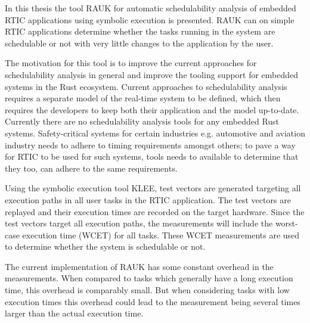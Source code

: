 In this thesis the tool RAUK for automatic schedulability analysis of embedded
RTIC applications using symbolic execution is presented. RAUK can on simple
RTIC applications determine whether the tasks running in the system are
schedulable or not with very little changes to the application by the user.

The motivation for this tool is to improve the current approaches for
schedulability analysis in general and improve the tooling support for embedded
systems in the Rust ecosystem. Current approaches to schedulability analysis
requires a separate model of the real-time system to be defined, which then
requires the developers to keep both their application and the model
up-to-date.  Currently there are no schedulability analysis tools for any
embedded Rust systems. Safety-critical systems for certain industries e.g.
automotive and aviation industry needs to adhere to timing requirements amongst
others; to pave a way for RTIC to be used for such systems, tools needs to
available to determine that they too, can adhere to the same requirements.

Using the symbolic execution tool KLEE, test vectors are generated targeting
all execution paths in all user tasks in the RTIC application. The test vectors
are replayed and their execution times are recorded on the target hardware.
Since the test vectors target all execution paths, the measurements will
include the worst-case execution time (WCET) for all tasks. These WCET
measurements are used to determine whether the system is schedulable or not.

The current implementation of RAUK has some constant overhead in the
measurements. When compared to tasks which generally have a long execution
time, this overhead is comparably small. But when considering tasks
with low execution times this overhead could lead to the measurement
being several times larger than the actual execution time.
